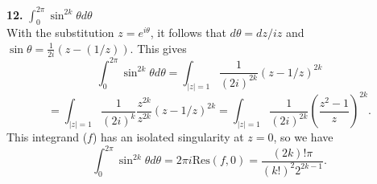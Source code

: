 \documentclass[12pt,letterpaper]{article}
\begin{document}
\textbf{12.} \(\int_{0}^{2\pi} \sin^{2k}\theta d\theta\) \\

With the substitution \(z = e^{i\theta}\), it follows that \(d\theta = dz/iz\) and \(\sin\theta = \frac{1}{2i}(z-(1/z))\). This gives \[\int_{0}^{2\pi} \sin^{2k}\theta d\theta = \int_{|z| = 1} \frac{1}{(2i)^{2k}}(z-1/z)^{2k}\]\[= \int_{|z| = 1} \frac{1}{(2i)^{k}} \frac{z^{2k}}{z^{2k}}(z-1/z)^{2k} = \int_{|z| = 1} \frac{1}{(2i)^{2k}} \left(\frac{z^{2} - 1}{z}\right)^{2k}.\] This integrand (\(f\)) has an isolated singularity at \(z = 0\), so we have  \[\int_{0}^{2\pi} \sin^{2k}\theta d\theta = 2\pi i \text{Res}(f, 0) = \frac{(2k)!\pi}{(k!)^{2}2^{2k-1}}.\]
\end{document}
